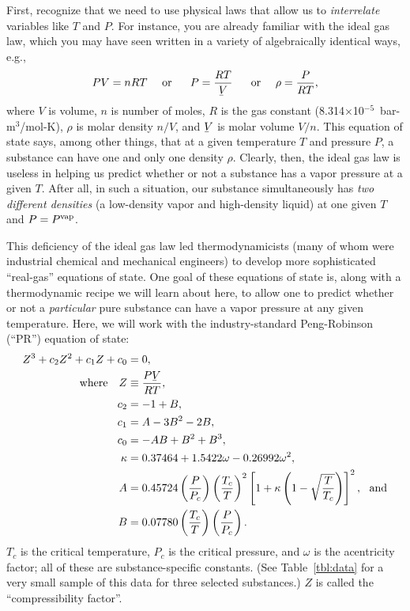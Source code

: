 \documentclass[11pt]{article}
\newcommand{\molar}[1]{\underaccent{\bar}{#1}}
\def\Vm{\molar{V}}
\begin{document}
First, recognize that we need to use physical laws that allow us to {\em interrelate} variables like $T$ and $P$.  For instance, you are already familiar with the ideal gas law, which you may have seen written in a variety of algebraically identical ways, e.g.,
%
\begin{equation}\label{eq:ideal-gas-law}
PV = n R T\ \ \ \ \mbox{or}\ \ \ \ \ P = \frac{RT}{\Vm}\ \ \ \ \ \mbox{or}\ \ \ \ \rho = \frac{P}{R T},
\end{equation}
%
where $V$ is volume, $n$ is number of moles, $R$ is the gas constant (8.314$\times$10$^{-5}$~bar-m$^3$/mol-K), $\rho$ is molar density $n/V$, and $\Vm$ is molar volume $V/n$.  This equation of state says, among other things, that at a given temperature $T$ and pressure $P$, a substance can have one and only one density $\rho$.  Clearly, then, the ideal gas law is useless in helping us predict whether or not a substance has a vapor pressure at a given $T$.  After all, in such a situation, our substance simultaneously has {\em two different densities} (a low-density vapor and high-density liquid) at one given $T$ and $P=P^{\rm vap}$.   

This deficiency of the ideal gas law led thermodynamicists (many of whom were industrial chemical and mechanical engineers) to develop more sophisticated ``real-gas'' equations of state.  One goal of these equations of state is, along with a thermodynamic recipe we will learn about here, to allow one to predict whether or not a {\em particular} pure substance can have a vapor pressure at any given temperature. Here, we will work with the industry-standard Peng-Robinson (``PR'') equation of state:
%
\begin{align}
\label{eq:pr-Z} Z^3+c_2 Z^2 + c_1 Z + c_0 & = 0,\\
\label{eq:prZ-Zdef}\mbox{where}\ \ \ Z & \equiv \frac{P\Vm}{RT},\\
\label{eq:c2} c_2 & = -1 + B,\\
\label{eq:c1} c_1 & = A - 3B^2 - 2B,\\
\label{eq:c0} c_0 & = -AB + B^2 + B^3,\\
\label{eq:pr-kappa} \kappa & = 0.37464 + 1.5422\omega -0.26992\omega^2,\\
\label{eq:prZ-A} A & = 0.45724\left(\frac{P}{P_c}\right)\left(\frac{T_c}{T}\right)^2\left[1+\kappa\left(1-\sqrt{\frac{T}{T_c}}\right)\right]^2,\ \ \mbox{and}\\
\label{eq:prZ-B} B & = 0.07780\left(\frac{T_c}{T}\right)\left(\frac{P}{P_c}\right).
\end{align}
%
$T_c$ is the critical temperature, $P_c$ is the critical pressure, and $\omega$ is the acentricity factor; all of these are substance-specific constants.  (See Table~\ref{tbl:data} for a very small sample of this data for three selected substances.)  $Z$ is called the ``compressibility factor''.
\end{document}
